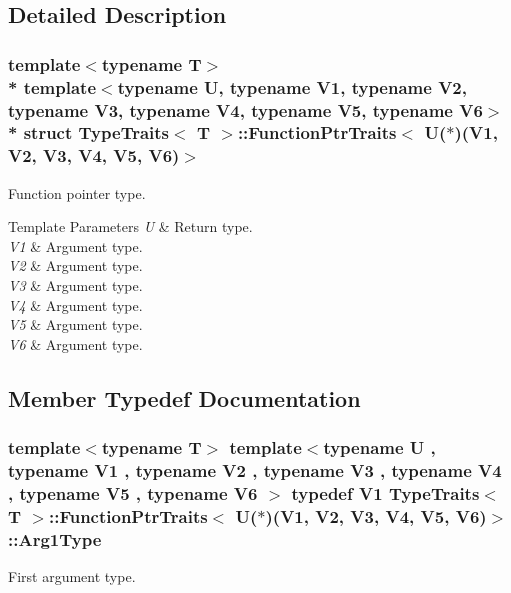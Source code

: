 \subsection{Detailed Description}
\subsubsection*{template$<$typename T$>$\\*
template$<$typename U, typename V1, typename V2, typename V3, typename V4, typename V5, typename V6$>$\\*
struct Type\+Traits$<$ T $>$\+::\+Function\+Ptr\+Traits$<$ U($\ast$)(\+V1, V2, V3, V4, V5, V6)$>$}

Function pointer type. 
\begin{DoxyTemplParams}{Template Parameters}
{\em U} & Return type. \\
\hline
{\em V1} & Argument type. \\
\hline
{\em V2} & Argument type. \\
\hline
{\em V3} & Argument type. \\
\hline
{\em V4} & Argument type. \\
\hline
{\em V5} & Argument type. \\
\hline
{\em V6} & Argument type. \\
\hline
\end{DoxyTemplParams}


\subsection{Member Typedef Documentation}
\subsubsection[{\texorpdfstring{Arg1\+Type}{Arg1Type}}]{\setlength{\rightskip}{0pt plus 5cm}template$<$typename T$>$ template$<$typename U , typename V1 , typename V2 , typename V3 , typename V4 , typename V5 , typename V6 $>$ typedef V1 {\bf Type\+Traits}$<$ T $>$\+::{\bf Function\+Ptr\+Traits}$<$ U($\ast$)(V1, V2, V3, V4, V5, V6)$>$\+::{\bf Arg1\+Type}}\hypertarget{structTypeTraits_1_1FunctionPtrTraits_3_01U_07_5_08_07V1_00_01V2_00_01V3_00_01V4_00_01V5_00_01V6_08_4_a728aa95ab6b5b639af07e15b85b80b51}{}\label{structTypeTraits_1_1FunctionPtrTraits_3_01U_07_5_08_07V1_00_01V2_00_01V3_00_01V4_00_01V5_00_01V6_08_4_a728aa95ab6b5b639af07e15b85b80b51}
First argument type. 
